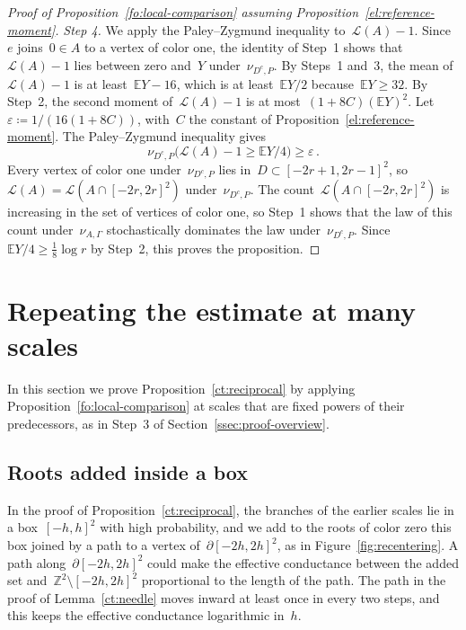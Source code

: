 \documentclass[11pt]{amsart}
\numberwithin{equation}{section}
\newcommand{\Z}{\mathbb Z}
\newcommand{\EE}{\mathbb E}
\newcommand{\cL}{\mathscr{L}}
\begin{document}
\begin{proof}[Proof of Proposition~\ref{fo:local-comparison} assuming Proposition~\ref{el:reference-moment}]
\emph{Step 4.} We apply the Paley--Zygmund inequality to~$\cL(A)-1$. Since~$e$ joins~$0\in A$ to a vertex of color one, the identity of Step~1 shows that~$\cL(A)-1$ lies between zero and~$Y$ under~$\nu_{D^c,P}$. By Steps~1 and~3, the mean of~$\cL(A)-1$ is at least~$\EE Y-16$, which is at least~$\EE Y/2$ because~$\EE Y\geq32$. By Step~2, the second moment of~$\cL(A)-1$ is at most~$(1+8C)(\EE Y)^2$. Let~$\varepsilon\coloneqq1/(16(1+8C))$, with~$C$ the constant of Proposition~\ref{el:reference-moment}. The Paley--Zygmund inequality gives
\begin{equation*}
\nu_{D^c,P}\bigl(\cL(A)-1\geq\EE Y/4\bigr)\geq\varepsilon\,.
\end{equation*}
Every vertex of color one under~$\nu_{D^c,P}$ lies in~$D\subset [-2r+1,2r-1]^2$, so~$\cL(A)=\cL(A\cap [-2r,2r]^2)$ under~$\nu_{D^c,P}$. The count~$\cL(A\cap [-2r,2r]^2)$ is increasing in the set of vertices of color one, so Step~1 shows that the law of this count under~$\nu_{A,\Gamma}$ stochastically dominates the law under~$\nu_{D^c,P}$. Since~$\EE Y/4\geq\tfrac18\log r$ by Step~2, this proves the proposition.
\end{proof}

\section{Repeating the estimate at many scales}\label{ct:section}

In this section we prove Proposition~\ref{ct:reciprocal} by applying Proposition~\ref{fo:local-comparison} at scales that are fixed powers of their predecessors, as in Step~3 of Section~\ref{ssec:proof-overview}.

\subsection{Roots added inside a box}

In the proof of Proposition~\ref{ct:reciprocal}, the branches of the earlier scales lie in a box~$[-h,h]^2$ with high probability, and we add to the roots of color zero this box joined by a path to a vertex of~$\partial[-2h,2h]^2$, as in Figure~\ref{fig:recentering}. A path along~$\partial[-2h,2h]^2$ could make the effective conductance between the added set and~$\Z^2\setminus [-2h,2h]^2$ proportional to the length of the path. The path in the proof of Lemma~\ref{ct:needle} moves inward at least once in every two steps, and this keeps the effective conductance logarithmic in~$h$.
\end{document}
